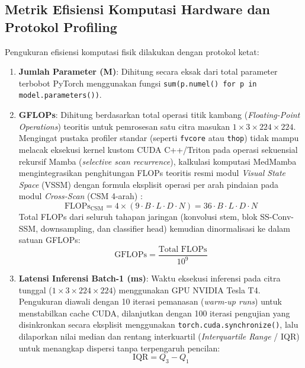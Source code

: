 \subsection{Metrik Efisiensi Komputasi Hardware dan Protokol Profiling} \label{III.MetrikKomputasi}
Pengukuran efisiensi komputasi fisik dilakukan dengan protokol ketat:
\begin{enumerate}[noitemsep]
	\item \textbf{Jumlah Parameter (M)}: Dihitung secara eksak dari total parameter terbobot PyTorch menggunakan fungsi \texttt{sum(p.numel() for p in model.parameters())}.
	\item \textbf{GFLOPs}: Dihitung berdasarkan total operasi titik kambang (\textit{Floating-Point Operations}) teoritis untuk pemrosesan satu citra masukan $1 \times 3 \times 224 \times 224$. Mengingat pustaka profiler standar (seperti \texttt{fvcore} atau \texttt{thop}) tidak mampu melacak eksekusi kernel kustom CUDA C++/Triton pada operasi sekuensial rekursif Mamba (\textit{selective scan recurrence}), kalkulasi komputasi MedMamba mengintegrasikan penghitungan FLOPs teoritis resmi modul \textit{Visual State Space} (VSSM) dengan formula eksplisit operasi per arah pindaian pada modul \textit{Cross-Scan} (CSM 4-arah) \cite{yue2024medmamba, liu2024vmamba}:
	\begin{equation}
		\text{FLOPs}_{\text{CSM}} = 4 \times (9 \cdot B \cdot L \cdot D \cdot N) = 36 \cdot B \cdot L \cdot D \cdot N
	\end{equation}
	Total FLOPs dari seluruh tahapan jaringan (konvolusi stem, blok SS-Conv-SSM, downsampling, dan classifier head) kemudian dinormalisasi ke dalam satuan GFLOPs:
	\begin{equation}
		\text{GFLOPs} = \frac{\text{Total FLOPs}}{10^9}
	\end{equation}

	\item \textbf{Latensi Inferensi Batch-1 (ms)}: Waktu eksekusi inferensi pada citra tunggal ($1 \times 3 \times 224 \times 224$) menggunakan GPU NVIDIA Tesla T4. Pengukuran diawali dengan 10 iterasi pemanasan (\textit{warm-up runs}) untuk menstabilkan cache CUDA, dilanjutkan dengan 100 iterasi pengujian yang disinkronkan secara eksplisit menggunakan \texttt{torch.cuda.synchronize()}, lalu dilaporkan nilai median dan rentang interkuartil (\textit{Interquartile Range} / IQR) untuk menangkap dispersi tanpa terpengaruh pencilan:
	\begin{equation}
		\text{IQR} = Q_3 - Q_1
	\end{equation}


\end{enumerate}
